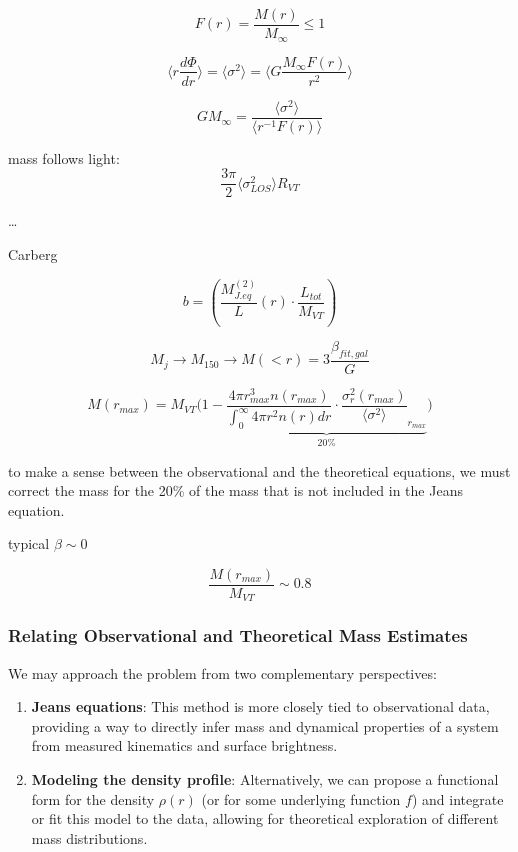 $$
F(r) = \dfrac{M(r)}{M_{\infty}} \le 1
$$

$$
\langle r \dfrac{d \Phi}{dr} \rangle = \langle \sigma^2 \rangle = \langle G \dfrac {M_{\infty} F(r)}{r^2} \rangle
$$

$$
G M_{\infty} = \dfrac{\langle \sigma^2 \rangle}{\langle r^{-1} F(r) \rangle}
$$


mass follows light:
$$
\dfrac{3 \pi}{2} \langle \sigma^2_{LOS} \rangle R_{VT}
$$

\dots

Carberg


$$
b = \left(\dfrac{M_{J. eq}^(2)}L(r) \cdot \dfrac{L_{tot}}{M_{VT}}\right)
$$

$$
M_j \to M_{150} \to M(< r) = 3 \dfrac{\beta_{fit, gal}}{G}
$$

$$
M(r_{max}) = M_{VT} \bigg( 1 - \underbrace{\dfrac{4 \pi r_{max}^3 n(r_{max})}{\int_0^\infty 4 \pi r^2 n(r) dr} \cdot \dfrac{\sigma_{r}^2(r_{max})}{\langle \sigma^2 \rangle}_{r_{max}}}_{20\%} \bigg)
$$

to make a sense between the observational and the theoretical equations, we must correct the mass for the 20\% of the mass that is not included in the Jeans equation.

typical $\beta \sim 0$

$$
\dfrac{M(r_{max})}{M_{VT}} \sim 0.8
$$

\subsubsection{Relating Observational and Theoretical Mass Estimates}

We may approach the problem from two complementary perspectives:

\begin{enumerate}
    \item \textbf{Jeans equations}: This method is more closely tied to observational data, providing a way to directly infer mass and dynamical properties of a system from measured kinematics and surface brightness.
    \item \textbf{Modeling the density profile}: Alternatively, we can propose a functional form for the density $\rho(r)$ (or for some underlying function $f$) and integrate or fit this model to the data, allowing for theoretical exploration of different mass distributions.
\end{enumerate}


